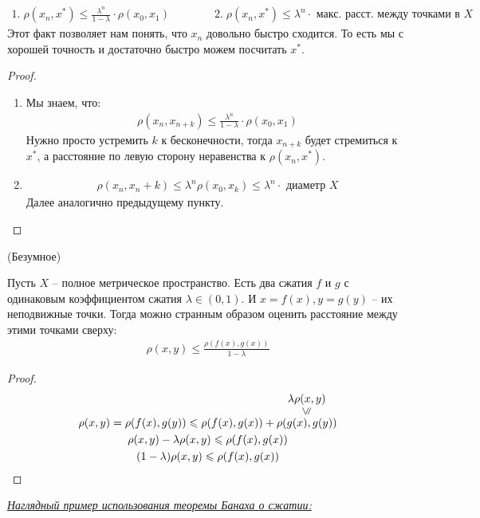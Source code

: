 \notice
\begin{gather*}
    1. \; \rho(x_n, x^*) \leqslant \frac{\lambda^n}{1 - \lambda} \cdot \rho(x_0, x_1) \qquad \qquad 
    2. \; \rho(x_n, x^*) \leqslant \lambda^n \cdot \text{ макс. расст. между точками в } X
\end{gather*} 
Этот факт позволяет нам понять, что $x_n$ довольно быстро сходится. То есть мы с хорошей точность и достаточно быстро можем посчитать $x^*$. 
\begin{proof} \quad 

    \begin{enumerate}
        \item Мы знаем, что:
        \begin{gather*}
            \rho(x_n, x_{n+k}) \leqslant \frac{\lambda^n}{1 - \lambda} \cdot \rho(x_0, x_1)
        \end{gather*}
        Нужно просто устремить $k$ к бесконечности, тогда $x_{n+k}$ будет стремиться к $x^*$, а расстояние по левую сторону неравенства к $\rho(x_n, x^*)$.
        \item \begin{gather*}
            \rho(x_n, x_n+k) \leqslant \lambda^n \rho(x_0, x_k) \leqslant \lambda^n \cdot \text{ диаметр } X
        \end{gather*}
        Далее аналогично предыдущему пункту.
    \end{enumerate}
\end{proof}
\follow \; (Безумное)

Пусть $X$ -- полное метрическое пространство. Есть два сжатия $f$ и $g$ с одинаковым коэффициентом сжатия $\lambda \in (0, 1)$.
И $x = f(x), y = g(y)$ -- их неподвижные точки. Тогда можно странным образом оценить расстояние между этими точками сверху: 
\begin{gather*}
    \rho(x, y) \leqslant \frac{\rho(f(x), g(x))}{1 - \lambda}
\end{gather*}
\begin{proof}
    \begin{gather*}
        \rho(x, y) = \rho(f(x), g(y)) \leqslant \rho(f(x), g(x)) + \lessabove{\rho(g(x), g(y))}{\lambda \rho(x, y)} \\
        \rho(x, y) - \lambda \rho(x, y) \leqslant \rho(f(x), g(x)) \\
        (1 - \lambda) \rho(x, y) \leqslant \rho(f(x), g(x))
    \end{gather*}
\end{proof}
\underline{\textit{Наглядный пример использования теоремы Банаха о сжатии:}}

